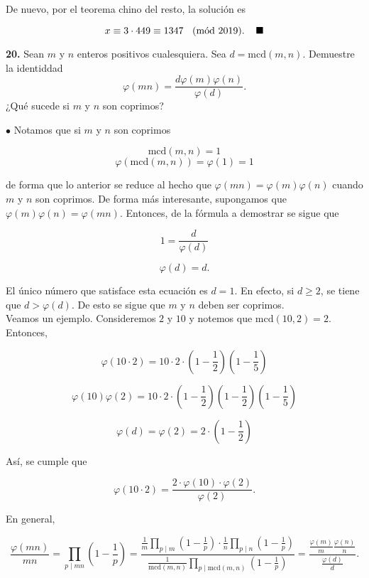 \documentclass{article}
\newcommand{\Mod}[1]{\ \hspace{0.2cm} (\mathrm{m\acute{o}d}\ #1)}
\begin{document}
De nuevo, por el teorema chino del resto, la solución es

$$x \equiv 3\cdot 449 \equiv 1347 \Mod{2019} . \hspace{0.4cm} \blacksquare $$

\newpage

\begin{mybox}
	\textbf{20. } Sean $m$ y $n$ enteros positivos cualesquiera. Sea $d = \text{mcd}(m, n)$. Demuestre la identiddad
	$$ \varphi(mn) = \frac{d \varphi(m) \varphi(n)}{\varphi(d)} .$$
	¿Qué sucede si $m$ y $n$ son coprimos?
\end{mybox}	

$\bullet$ Notamos que si $m$ y $n$ son coprimos

$$ \text{mcd}(m, n) = 1 $$
$$ \varphi( \text{mcd}(m, n) ) = \varphi(1) = 1 $$

de forma que lo anterior se reduce al hecho que $\varphi(mn) = \varphi(m)\varphi(n)$ cuando $m$ y $n$ son coprimos. De forma más interesante, supongamos que $\varphi(m)\varphi(n) = \varphi(mn)$. Entonces, de la fórmula a demostrar se sigue que 

$$ 1 = \frac{d}{\varphi(d)} $$

$$  \varphi(d) = d .$$

El único número que satisface esta ecuación es $d = 1$. En efecto, si $d \geq 2$, se tiene que $d > \varphi(d)$. De esto se sigue que $m$ y $n$ deben ser coprimos. \\

Veamos un ejemplo. Consideremos $2$ y $10$ y notemos que $\text{mcd}(10, 2) = 2.$ Entonces, 

$$ \varphi(10 \cdot 2) = 10 \cdot 2 \cdot \left( 1 - \frac{1}{2} \right)  \left( 1 - \frac{1}{5} \right)$$

$$ \varphi(10)\varphi(2) = 10 \cdot 2 \cdot  \left( 1 - \frac{1}{2} \right)  \left( 1 - \frac{1}{2} \right)  \left( 1 - \frac{1}{5} \right) $$

$$\varphi(d) = \varphi(2) = 2 \cdot  \left( 1 - \frac{1}{2} \right) $$

Así, se cumple que

$$ \varphi(10 \cdot 2 ) = \frac{2 \cdot  \varphi(10) \cdot \varphi(2)}{ \varphi(2)}. $$

En general,

$$ \frac{\varphi(mn)}{mn} = \prod_{p \mid mn} \left( 1 - \frac{1}{p} \right) = \frac{\frac{1}{m} \prod_{p \mid m} \left( 1 - \frac{1}{p} \right) \cdot \frac{1}{n} \prod_{p \mid n} \left( 1 - \frac{1}{p} \right) }{\frac{1}{\text{mcd}(m, n)} \prod_{p \mid \text{mcd}(m, n)} \left( 1 - \frac{1}{p} \right)} = \frac{\frac{\varphi(m)}{m} \frac{\varphi(n)}{n}}{\frac{\varphi(d)}{d}}.  $$
\end{document}
